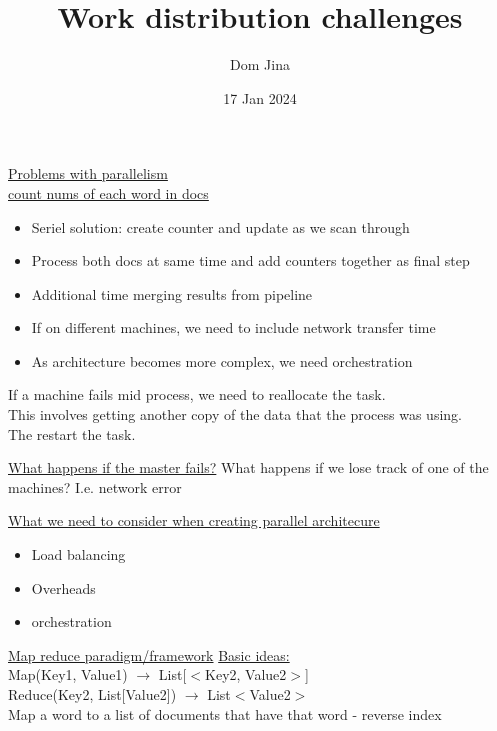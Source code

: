 \documentclass{article}
\title{Work distribution challenges}
\author{Dom Jina}
\date{17 Jan 2024}
\begin{document}
\maketitle

\newpage

\underline{Problems with parallelism} \\

\underline{count nums of each word in docs}
\begin{itemize}
    \item Seriel solution: create counter and update as we scan through
    \item Process both docs at same time and add counters together as final step
    \item Additional time merging results from pipeline
    \item If on different machines, we need to include network transfer time
    \item As architecture becomes more complex, we need orchestration
\end{itemize}

If a machine fails mid process, we need to reallocate the task. \\ 
This involves getting another copy of the data that the process was using. \\ 
The restart the task. \newline

\underline{What happens if the master fails?} \newline
What happens if we lose track of one of the machines? I.e. network error \newline

\underline{What we need to consider when creating parallel architecure}
\begin{itemize}
    \item Load balancing
    \item Overheads
    \item orchestration
\end{itemize}
 \newpage

\underline{Map reduce paradigm/framework} \newline
\underline{Basic ideas:} \\
Map(Key1, Value1) $\rightarrow$ List[$<$Key2, Value2$>$] \\
Reduce(Key2, List[Value2]) $\rightarrow$ List$<$Value2$>$ \\

Map a word to a list of documents that have that word - reverse index \newline
\end{document}
